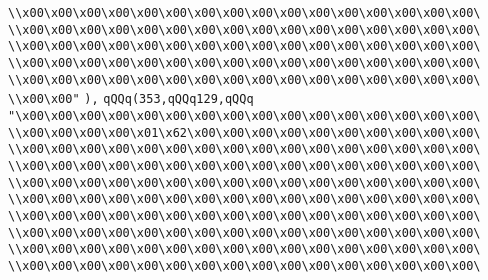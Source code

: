 \verb|\\x00\x00\x00\x00\x00\x00\x00\x00\x00\x00\x00\x00\x00\x00\x00\x00\|\newline
\verb|\\x00\x00\x00\x00\x00\x00\x00\x00\x00\x00\x00\x00\x00\x00\x00\x00\|\newline
\verb|\\x00\x00\x00\x00\x00\x00\x00\x00\x00\x00\x00\x00\x00\x00\x00\x00\|\newline
\verb|\\x00\x00\x00\x00\x00\x00\x00\x00\x00\x00\x00\x00\x00\x00\x00\x00\|\newline
\verb|\\x00\x00\x00\x00\x00\x00\x00\x00\x00\x00\x00\x00\x00\x00\x00\x00\|\newline
\verb|\\x00\x00"|\newline
\verb|),|\newline
\verb|qQQq(353,qQQq129,qQQq|\newline
\verb|"\x00\x00\x00\x00\x00\x00\x00\x00\x00\x00\x00\x00\x00\x00\x00\x00\|\newline
\verb|\\x00\x00\x00\x00\x01\x62\x00\x00\x00\x00\x00\x00\x00\x00\x00\x00\|\newline
\verb|\\x00\x00\x00\x00\x00\x00\x00\x00\x00\x00\x00\x00\x00\x00\x00\x00\|\newline
\verb|\\x00\x00\x00\x00\x00\x00\x00\x00\x00\x00\x00\x00\x00\x00\x00\x00\|\newline
\verb|\\x00\x00\x00\x00\x00\x00\x00\x00\x00\x00\x00\x00\x00\x00\x00\x00\|\newline
\verb|\\x00\x00\x00\x00\x00\x00\x00\x00\x00\x00\x00\x00\x00\x00\x00\x00\|\newline
\verb|\\x00\x00\x00\x00\x00\x00\x00\x00\x00\x00\x00\x00\x00\x00\x00\x00\|\newline
\verb|\\x00\x00\x00\x00\x00\x00\x00\x00\x00\x00\x00\x00\x00\x00\x00\x00\|\newline
\verb|\\x00\x00\x00\x00\x00\x00\x00\x00\x00\x00\x00\x00\x00\x00\x00\x00\|\newline
\verb|\\x00\x00\x00\x00\x00\x00\x00\x00\x00\x00\x00\x00\x00\x00\x00\x00\|\newline
